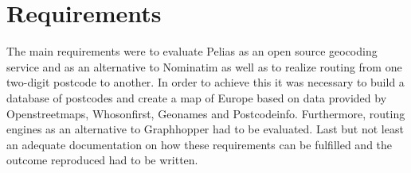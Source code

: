 
\section{Requirements} \label{Req}
The main requirements were to evaluate Pelias as an open source geocoding service and as an alternative to Nominatim as well as to realize routing from one two-digit postcode to another. In order to achieve this it was necessary to build a database of postcodes and create a map of Europe based on data provided by Openstreetmaps, Whosonfirst, Geonames and Postcodeinfo. Furthermore, routing engines as an alternative to Graphhopper had to be evaluated. Last but not least an adequate documentation on how these requirements can be fulfilled and the outcome reproduced had to be written.